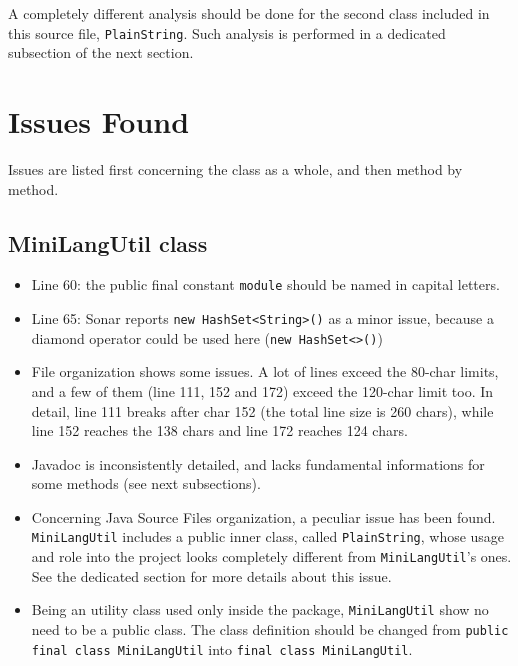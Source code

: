 \documentclass[11pt]{article} %
\begin{document}
A completely different analysis should be done for the second class included in this source file, \texttt{PlainString}. Such analysis is performed in a dedicated subsection of the next section.


\section{Issues Found}
Issues are listed first concerning the class as a whole, and then method by method.

\subsection{MiniLangUtil class}
\begin{itemize}
	\item Line 60: the public final constant \texttt{module} should be named in capital letters.

	\item Line 65: Sonar reports \texttt{new HashSet<String>()} as a minor issue, because a diamond operator could be used here (\texttt{new HashSet<>()})
	
	\item File organization shows some issues. A lot of lines exceed the 80-char limits, and a few of them (line 111, 152 and 172) exceed the 120-char limit too. In detail, line 111 breaks after char 152 (the total line size is 260 chars), while line 152 reaches the 138 chars and line 172 reaches 124 chars.

	\item Javadoc is inconsistently detailed, and lacks fundamental informations for some methods (see next subsections).

	\item Concerning Java Source Files organization, a peculiar issue has been found. \texttt{MiniLangUtil} includes a public inner class, called \texttt{PlainString}, whose usage and role into the project looks completely different from \texttt{MiniLangUtil}'s ones. See the dedicated section for more details about this issue.

	\item Being an utility class used only inside the package, \texttt{MiniLangUtil} show no need to be a public class. The class definition should be changed from \texttt{public final class MiniLangUtil} into \texttt{final class MiniLangUtil}. 

\end{itemize}
\end{document}
